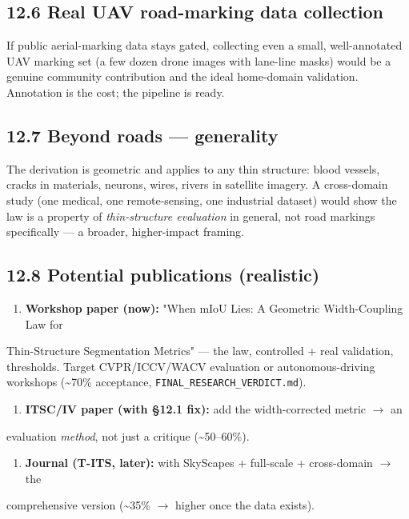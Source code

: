 \documentclass[11pt]{article}
\begin{document}
\subsection*{12.6 Real UAV road-marking data collection}

If public aerial-marking data stays gated, collecting even a small, well-annotated UAV marking set (a few dozen drone images with lane-line masks) would be a genuine community contribution and the ideal home-domain validation. Annotation is the cost; the pipeline is ready.

\subsection*{12.7 Beyond roads --- generality}

The derivation is geometric and applies to any thin structure: blood vessels, cracks in materials, neurons, wires, rivers in satellite imagery. A cross-domain study (one medical, one remote-sensing, one industrial dataset) would show the law is a property of \textit{thin-structure evaluation} in general, not road markings specifically --- a broader, higher-impact framing.

\subsection*{12.8 Potential publications (realistic)}

\begin{enumerate}\setlength{\itemsep}{1pt}
\item \textbf{Workshop paper (now):} "When mIoU Lies: A Geometric Width-Coupling Law for
\end{enumerate}
   Thin-Structure Segmentation Metrics" --- the law, controlled + real validation,    thresholds. Target CVPR/ICCV/WACV evaluation or autonomous-driving workshops    (\textasciitilde{}70\% acceptance, \texttt{FINAL\_RESEARCH\_VERDICT.md}).
\begin{enumerate}\setlength{\itemsep}{1pt}
\item \textbf{ITSC/IV paper (with \S{}12.1 fix):} add the width-corrected metric $\rightarrow$ an
\end{enumerate}
   evaluation \textit{method}, not just a critique (\textasciitilde{}50--60\%).
\begin{enumerate}\setlength{\itemsep}{1pt}
\item \textbf{Journal (T-ITS, later):} with SkyScapes + full-scale + cross-domain $\rightarrow$ the
\end{enumerate}
   comprehensive version (\textasciitilde{}35\% $\rightarrow$ higher once the data exists).
\end{document}
